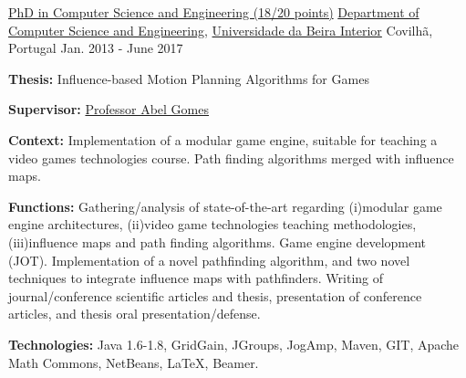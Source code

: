 

\begin{cventries}

  \cventry
    {\href{https://www.ubi.pt/en/course/849}{PhD in Computer Science and Engineering (18/20 points)}} %
    {\href{https://www.di.ubi.pt/}{Department of Computer Science and Engineering}, \href{http://www.ubi.pt/}{Universidade da Beira Interior}} %
    {Covilh\~{a}, Portugal} %
    {Jan. 2013 - June 2017} %
    {
      \begin{cvitems} %
        \item {\textbf{Thesis:} Influence-based Motion Planning Algorithms for Games}
        \item {\textbf{Supervisor:} \href{http://www.di.ubi.pt/~agomes/}{Professor Abel Gomes}}
        \item {\textbf{Context:} Implementation of a modular game engine, suitable for teaching a video games technologies course.%
        Path finding algorithms merged with influence maps.}
        \item {\textbf{Functions:} Gathering/analysis of state-of-the-art regarding (i)modular game engine architectures, (ii)video game technologies teaching methodologies, (iii)influence maps and path finding algorithms. %
        Game engine development (JOT). %
        Implementation of a novel pathfinding algorithm, and two novel techniques to integrate influence maps with pathfinders. Writing of journal/conference scientific articles and thesis, presentation of conference articles, and thesis oral presentation/defense.}
        \item {\textbf{Technologies:} Java 1.6-1.8, GridGain, JGroups, JogAmp, Maven, GIT, Apache Math Commons, NetBeans, %
LaTeX, Beamer.} %
      \end{cvitems}
    }


\end{cventries}

